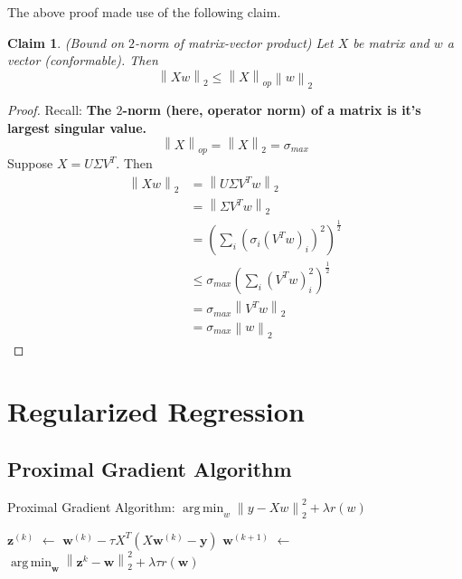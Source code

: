 \documentclass[12pt]{article}
\newtheorem{claim}{Claim}
\theoremstyle{definition}
\newcommand*\Let[2]{\State #1 $\gets$ #2}
\DeclareMathOperator*{\argmin}{arg\,min}
\newcommand{\norm}[1]{\left\lVert#1\right\rVert}
\begin{document}
The above proof made use of the following claim.
\begin{claim}(Bound on $2$-norm of matrix-vector product)
Let $X$ be matrix and $w$ a vector (conformable). Then
\begin{equation}
	\norm{Xw}_{2} \leq \norm{X}_{op}\norm{w}_2
\end{equation}
\end{claim}
\begin{proof}
Recall: \textbf{The $2$-norm (here, operator norm) of a matrix is it's largest singular value.}
\begin{equation}
	\norm{X}_{op} = \norm{X}_2 = \sigma_{max}
\end{equation}
Suppose $X = U\Sigma V^T$. Then
\begin{align*}
	\norm{Xw}_2 &= \norm{U\Sigma V^T w}_2 \\
	&= \norm{\Sigma V^T w}_2 \tag{$U$ orthonormal, preserves norms} \\
	&= \left(\sum_i\left(\sigma_i (V^T w)_i \right)^2 \right)^{\frac{1}{2}} \\
	&\leq \sigma_{max} \left(\sum_i(V^T w)^2_i \right)^{\frac{1}{2}} \\
	&= \sigma_{max} \norm{V^T w}_2 \tag{definition of norm} \\
	&= \sigma_{max} \norm{w}_2 \tag{$V, V^T$ orthonormal, preserves norms}
\end{align*}
\end{proof}

\section{Regularized Regression}

\subsection{Proximal Gradient Algorithm}
\begin{algorithm}
  \caption{Proximal Gradient Algorithm: $\argmin_w \norm{y - Xw}^2_2 + \lambda r(w)$}
  \begin{algorithmic}[H]
    	\Let{$\bm z^{(k)}$}{$\bm w^{(k)} - \tau X^T(X\bm w^{(k)} - \bm y)$} 
    	\Let{$\bm w^{(k+1)}$}{$\argmin_{\bm w} \norm{\bm z^{k} - \bm w}^2_2 + \lambda \tau r(\bm w)$} 
    \EndFor
  \end{algorithmic}
\end{algorithm}
\end{document}
